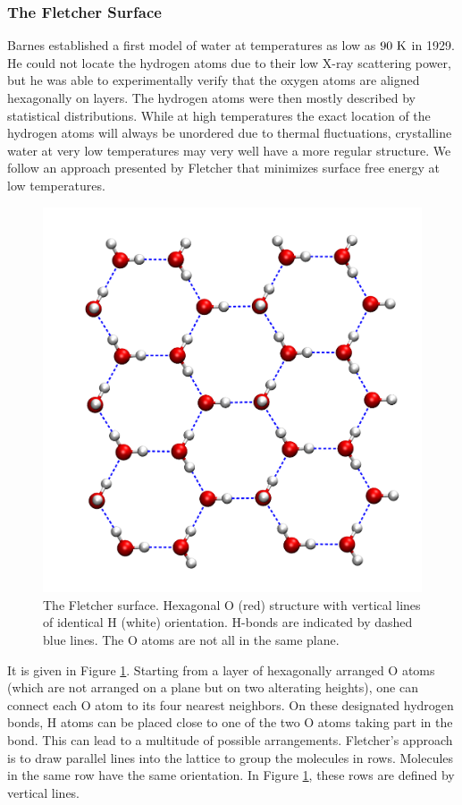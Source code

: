\documentclass[8.5pt,twoside,twocolumn]{article}
\renewcommand\K{{\enmat{~\te{K}}}}
\theoremstyle{standard}
\begin{document}
\subsubsection{The Fletcher Surface}
Barnes \cite{Barnes1929} established a first model of water at temperatures
as low as $90\K$ in 1929. He could not locate the hydrogen atoms due
to their low X-ray scattering power\cite{Fletcher1966}, but he was able
to experimentally verify that the oxygen atoms are aligned hexagonally
on layers. The hydrogen atoms were then mostly described by statistical
distributions. While at high temperatures the exact location of the hydrogen
atoms will always be unordered due to thermal fluctuations, crystalline
water at very low temperatures may very well have a more regular structure.
We follow an approach presented by Fletcher\cite{Fletcher1992} that minimizes
surface free energy at low temperatures.

\begin{figure}[ht]
\includegraphics[width=.48\textwidth]{./img/FletcherAboveGlossyNoCueing.png}
\caption{The Fletcher surface. Hexagonal O (red) structure with vertical lines 
of identical H (white) orientation. H-bonds are indicated by dashed blue lines.
The O atoms are not all in the same plane.}
\label{Fig:Ads:Fletcher}
\end{figure}

It is given in Figure \ref{Fig:Ads:Fletcher}. Starting from a layer of
hexagonally arranged O atoms (which are not arranged on a plane but on
two alterating heights), one can connect each O atom to its four nearest
neighbors. On these designated hydrogen bonds, H atoms can be placed close
to one of the two O atoms taking part in the bond. This can lead to a multitude
of possible arrangements. Fletcher's approach is to draw parallel
lines into the lattice to group the molecules in rows. Molecules in the
same row have the same orientation. In Figure \ref{Fig:Ads:Fletcher}, these
rows are defined by vertical lines.
\end{document}
